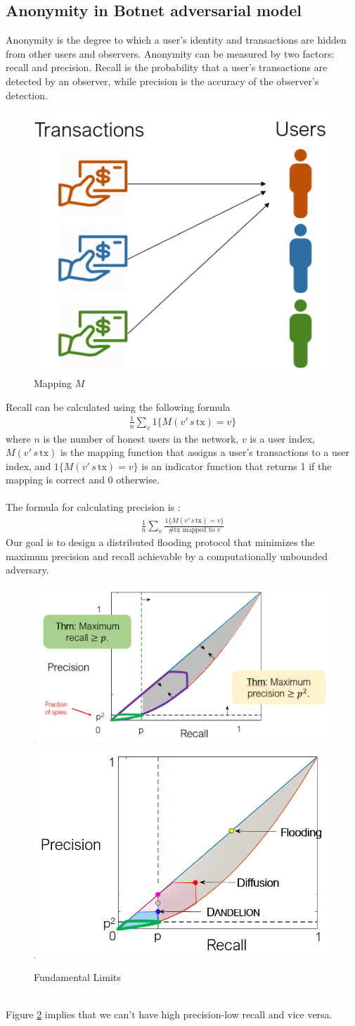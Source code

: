  \subsection{Anonymity in Botnet adversarial model}
 Anonymity is the degree to which a user’s identity and transactions are hidden from other users and observers. Anonymity can be measured by two factors: recall and precision. Recall is the probability that a user’s transactions are detected by an observer, while precision is the accuracy of the observer’s detection.
 \begin{figure}[h!]
    \centering
    \includegraphics[width=0.25\linewidth]{Fig/04/F12}
    \caption{Mapping $M$}
    \label{fig:f12}
 \end{figure}
 Recall can be calculated using the following formula
 \begin{align*}
    \frac{1}{n}\sum_v 1\{M(v' \, s \, \text{tx}) = v\}
 \end{align*}
 where $n$ is the number of honest users in the network, $v$ is a user index, $M(v' \, s \, \text{tx})$ is the mapping function that assigns a user’s transactions to a user index, and $1\{M(v' \, s \, \text{tx}) = v\}$ is an indicator function that returns 1 if the mapping is correct and 0 otherwise.\\\\
 The formula for calculating precision is :
 \begin{align*}
    \frac{1}{n}\sum_v \frac{1\{M(v' \, s \, \text{tx}) = v\}}{\text{\# tx mapped to } v}
 \end{align*}
Our goal is to design a distributed flooding protocol that minimizes the maximum precision and recall achievable by a computationally unbounded adversary. \\
\begin{figure}[h!]
    \centering
    \includegraphics[width=0.5\linewidth]{Fig/04/F13}
    \includegraphics[width=0.4\linewidth]{Fig/04/F14}
    \caption{Fundamental Limits}
    \label{fig:f13}
\end{figure}\\
Figure \ref{fig:f13} implies that we can’t have high precision-low recall and vice versa.

